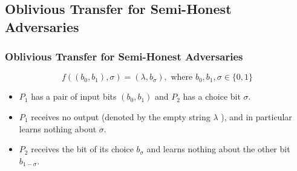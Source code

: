 \documentclass{beamer}
\begin{document}
    \subsection{Oblivious Transfer for Semi-Honest Adversaries}
    \begin{frame}
        \frametitle{Oblivious Transfer for Semi-Honest Adversaries}
        \begin{definition}
            $$
            f\left(\left(b_{0}, b_{1}\right), \sigma\right)=\left(\lambda, b_{\sigma}\right), \text { where } b_{0}, b_{1}, \sigma \in\{0,1\}
            $$
            
        \end{definition}

        \begin{itemize}
            \item $P_{1}$ has a pair of input bits $\left(b_{0}, b_{1}\right)$ and $P_{2}$ has a choice bit $\sigma .$ 
            \item $P_{1}$ receives no output (denoted by the empty string $\lambda$ ), and in particular learns nothing about $\sigma .$ 
            \item $P_{2}$ receives the bit of its choice $b_{\sigma}$ and learns nothing about the other bit $b_{1-\sigma} .$
        \end{itemize}
        
    
    \end{frame}
\end{document}

